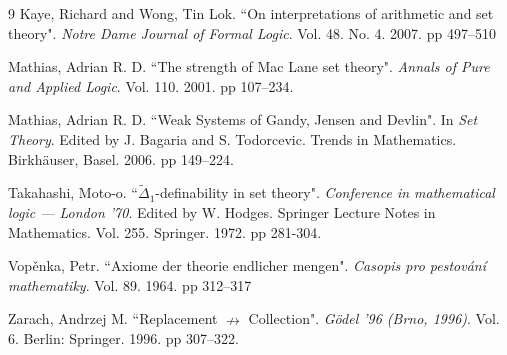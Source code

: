 \documentclass[11pt, a4paper]{article}
\newcounter{Theor1}
\begin{document}
\begin{thebibliography}{9}
 Kaye, Richard and Wong, Tin Lok. ``On interpretations of arithmetic and set theory". {\it Notre Dame Journal of Formal Logic}. Vol. 48. No. 4. 2007. pp 497--510




 Mathias, Adrian R. D. ``The strength of Mac Lane set theory". \emph{Annals of Pure and Applied Logic}. Vol. 110. 2001. pp 107--234.

 Mathias, Adrian R. D. ``Weak Systems of Gandy, Jensen and Devlin". In {\it Set Theory}. Edited by J. Bagaria and S. Todorcevic. Trends in Mathematics. Birkh\"{a}user, Basel. 2006. pp 149--224.





 Takahashi, Moto-o. ``$\tilde{\Delta}_1$-definability in set theory". \emph{Conference in mathematical logic --- London '70}. Edited by W. Hodges. Springer Lecture Notes in Mathematics. Vol. 255. Springer. 1972. pp 281-304.

 Vop\v{e}nka, Petr. ``Axiome der theorie endlicher mengen". {\it Casopis pro pestov\'{a}n\'{i} mathematiky}. Vol. 89. 1964. pp 312--317 

 Zarach, Andrzej M. ``Replacement $\nrightarrow$ Collection". \emph{G\"{o}del '96 (Brno, 1996)}. Vol. 6. Berlin: Springer. 1996. pp 307--322.

\end{thebibliography}          
\end{document}
